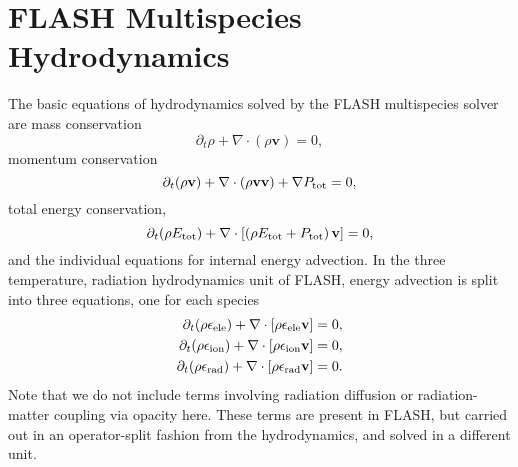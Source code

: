 \documentclass[preprint,11pt]{aastex}
\newcommand{\beq}{\begin{equation}}
\newcommand{\eeq}{\end{equation}}
\newcommand{\bea}{\begin{eqnarray}}
\newcommand{\eea}{\end{eqnarray}}
\begin{document}
\section{FLASH Multispecies Hydrodynamics}
\label{sec:hydro}
The basic equations of hydrodynamics solved by the FLASH multispecies solver are mass conservation
\beq 
\label{eq:e1}
\partial_t \rho + \nabla \cdot (\rho \mathbf{v}) = 0, 
\eeq
momentum conservation
{\color{red}
\beq
\label{eq:e2}
\partial_t (\rho\mathbf{v}) + \nabla \cdot (\rho\mathbf{v}\mathbf{v}) + \nabla P_{\rm tot} = 0,
\eeq
}
total energy conservation,
\beq
\label{eq:e3}
\partial_t (\rho E_{\rm tot}) + \nabla \cdot \left[ \left( \rho E_{\rm tot} + P_{\rm tot} \right) \mathbf{v} \right] = 0,
\eeq
and the individual equations for internal energy advection.  In the three temperature, radiation hydrodynamics unit of FLASH, energy advection is split into three equations, one for each species
\bea 
\label{eq:e4}
\partial_t (\rho \epsilon_{\rm ele}) + \nabla \cdot [\rho \epsilon_{\rm ele} \mathbf{v}] = 0, \\
\label{eq:e5}
\partial_t (\rho \epsilon_{\rm ion}) + \nabla \cdot [\rho \epsilon_{\rm ion} \mathbf{v}] = 0, \\
\label{eq:e6}
\partial_t (\rho \epsilon_{\rm rad}) + \nabla \cdot [\rho \epsilon_{\rm rad} \mathbf{v}] = 0.
\eea
Note that we do not include terms involving radiation diffusion or radiation-matter coupling via opacity here.  These terms are present in FLASH, but carried out in an operator-split fashion from the hydrodynamics, and solved in a different unit.
\end{document}
